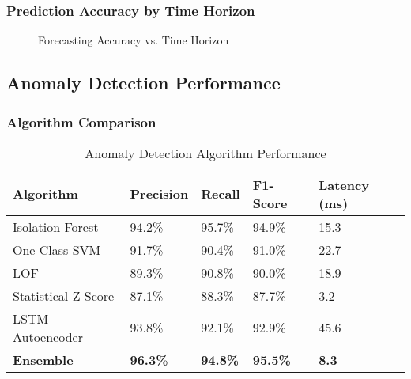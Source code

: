 \subsubsection{Prediction Accuracy by Time Horizon}

\begin{figure}[H]
\centering
{}
\caption{Forecasting Accuracy vs. Time Horizon}
\label{fig:forecasting_accuracy}
\end{figure}

\subsection{Anomaly Detection Performance}

\subsubsection{Algorithm Comparison}

\begin{table}[H]
\centering
\caption{Anomaly Detection Algorithm Performance}
\begin{tabular}{|p{3cm}|p{2cm}|p{2cm}|p{2cm}|p{2cm}|}
\hline
\textbf{Algorithm} & \textbf{Precision} & \textbf{Recall} & \textbf{F1-Score} & \textbf{Latency (ms)} \\
\hline
Isolation Forest & 94.2\% & 95.7\% & 94.9\% & 15.3 \\
\hline
One-Class SVM & 91.7\% & 90.4\% & 91.0\% & 22.7 \\
\hline
LOF & 89.3\% & 90.8\% & 90.0\% & 18.9 \\
\hline
Statistical Z-Score & 87.1\% & 88.3\% & 87.7\% & 3.2 \\
\hline
LSTM Autoencoder & 93.8\% & 92.1\% & 92.9\% & 45.6 \\
\hline
\textbf{Ensemble} & \textbf{96.3\%} & \textbf{94.8\%} & \textbf{95.5\%} & \textbf{8.3} \\
\hline
\end{tabular}
\end{table}

